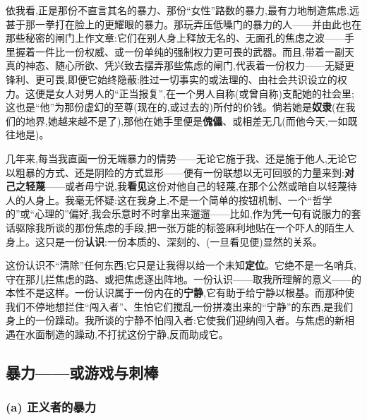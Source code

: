 \dmark{}依我看,正是那份不直言其名的暴力、那份“女性”路数的暴力,最有力地制造焦虑,远甚于那一拳打在脸上的更耀眼的暴力。那玩弄压低嗓门的暴力的人——并由此也在那些秘密的闸门上作文章:它们在别人身上释放无名的、无面孔的焦虑之波——手里握着一件比一份权威、或一份单纯的强制权力更可畏的武器。而且,带着一副天真的神态、随心所欲、凭兴致去摆弄那些焦虑的闸门,代表着一份权力——无疑更锋利、更可畏,即便它始终隐蔽:胜过一切事实的或法理的、由社会共识设立的权力。这便是女人对男人的“正当报复”,在一个男人自称(或曾自称)支配她的社会里;这也是“他”为那份虚幻的至尊(现在的,或过去的)所付的价钱。倘若她是\textbf{奴隶}(在我们的地界,她越来越不是了),那他在她手里便是\textbf{傀儡}、或相差无几(而他今天,一如既往地是)。

几年来,每当我直面一份无端暴力的情势——无论它施于我、还是施于他人,无论它以粗暴的方式、还是阴险的方式显形——便有一份联想以无可回驳的力量来到:\textbf{对己之轻蔑}——或者毋宁说,我\textbf{看见}这份对他自己的轻蔑,在那个公然或暗自以轻蔑待人的人身上。我毫无怀疑:这在我身上,不是\dmark{}一个简单的按钮机制、一个“哲学的”或“心理的”偏好,我会乐意时不时拿出来遛遛——比如,作为凭一句有说服力的套话驱除我所谈的那份焦虑的手段,把一张万能的标签麻利地贴在一个吓人的陌生人身上。这只是一份\textbf{认识}:一份本质的、深刻的、(一旦看见便)显然的关系。

这份认识不“清除”任何东西;它只是让我得以给一个未知\textbf{定位}。它绝不是一名哨兵,守在那儿拦焦虑的路、或把焦虑逐出阵地。一份认识——取我所理解的意义——的本性不是这样。一份认识属于一份内在的\textbf{宁静},它有助于给宁静以根基。而那种使我们不停地想拦住“闯入者”、生怕它们搅乱一份拼凑出来的“宁静”的东西,是我们身上的一份躁动。我所谈的宁静不怕闯入者:它使我们迎纳闯入者。与焦虑的新相遇在水面制造的躁动,不打扰这份宁静,反而助成它。

\subsection{暴力——或游戏与刺棒}
\label{ch18:local:h53}

\subsubsection*{(a) 正义者的暴力}
\label{ch18:local:h54}

\label{ch18:local:n49}

